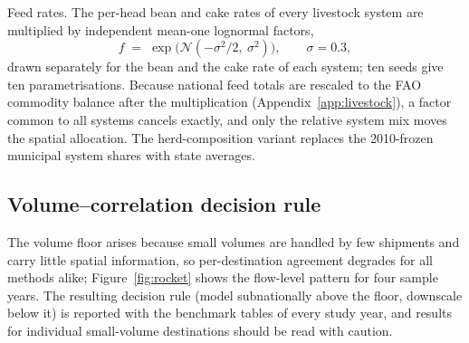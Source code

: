 \documentclass[pdflatex,sn-nature]{sn-jnl}%
\begin{document}
Feed rates. The per-head bean and cake rates of every livestock system
are multiplied by independent mean-one lognormal factors,
\begin{equation}\label{eq:feedjitter}
  f \;=\; \exp\!\big(\mathcal{N}(-\sigma^2/2,\ \sigma^2)\big),
  \qquad \sigma = 0.3 ,
\end{equation}
drawn separately for the bean and the cake rate of each system; ten
seeds give ten parametrisations. Because national feed totals are
rescaled to the FAO commodity balance after the multiplication
(Appendix~\ref{app:livestock}), a factor common to all systems cancels
exactly, and only the relative system mix moves the spatial
allocation. The herd-composition variant replaces the 2010-frozen
municipal system shares with state averages.

\subsection{Volume--correlation decision rule}\label{subsubsec:volcorr}
The volume floor arises because small volumes are handled by few
shipments and carry little spatial information, so per-destination
agreement degrades for all methods alike; Figure~\ref{fig:rocket} shows
the flow-level pattern for four sample years. The resulting decision rule
(model subnationally above the floor, downscale below it) is reported with
the benchmark tables of every study year, and results for individual
small-volume destinations should be read with caution.



%
\end{document}
